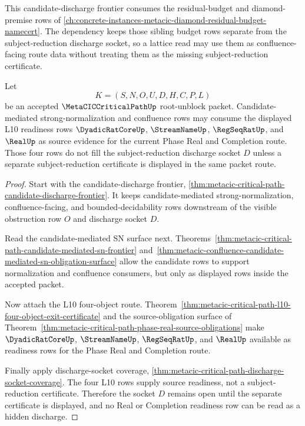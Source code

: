 This candidate-discharge frontier consumes the residual-budget and diamond-premise rows of \autoref{ch:concrete-instances-metacic-diamond-residual-budget-namecert}. The dependency keeps those sibling budget rows separate from the subject-reduction discharge socket, so a lattice read may use them as confluence-facing route data without treating them as the missing subject-reduction certificate.

\begin{theorem}
\label{thm:metaciccriticalpath-candidate-frontier-l10-discharge-boundary}
Let
$$
K=(S,N,O,U,D,H,C,P,L)
$$
be an accepted $\MetaCICCriticalPathUp$ root-unblock packet. Candidate-mediated strong-normalization and confluence rows may consume the displayed L10 readiness rows $\DyadicRatCoreUp$, $\StreamNameUp$, $\RegSeqRatUp$, and $\RealUp$ as source evidence for the current Phase Real and Completion route. Those four rows do not fill the subject-reduction discharge socket $D$ unless a separate subject-reduction certificate is displayed in the same packet route.
\end{theorem}
\begin{proof}
Start with the candidate-discharge frontier, \autoref{thm:metacic-critical-path-candidate-discharge-frontier}. It keeps candidate-mediated strong-normalization, confluence-facing, and bounded-decidability rows downstream of the visible obstruction row $O$ and discharge socket $D$.

Read the candidate-mediated SN surface next. Theorems~\ref{thm:metacic-critical-path-candidate-mediated-sn-frontier} and~\ref{thm:metacic-confluence-candidate-mediated-sn-obligation-surface} allow the candidate rows to support normalization and confluence consumers, but only as displayed rows inside the accepted packet.

Now attach the L10 four-object route. Theorem~\ref{thm:metacic-critical-path-l10-four-object-exit-certificate} and the source-obligation surface of Theorem~\ref{thm:metacic-critical-path-phase-real-source-obligations} make $\DyadicRatCoreUp$, $\StreamNameUp$, $\RegSeqRatUp$, and $\RealUp$ available as readiness rows for the Phase Real and Completion route.

Finally apply discharge-socket coverage, \autoref{thm:metacic-critical-path-discharge-socket-coverage}. The four L10 rows supply source readiness, not a subject-reduction certificate. Therefore the socket $D$ remains open until the separate certificate is displayed, and no Real or Completion readiness row can be read as a hidden discharge.
\end{proof}

